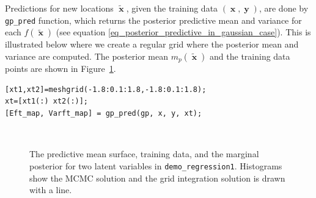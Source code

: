 \documentclass[twoside,11pt]{article}
\DeclareMathOperator{\x}{\mathbf{x}}
\DeclareMathOperator{\y}{\mathbf{y}}
\newcommand{\code}[1]{{\normalfont\texttt{#1}}}
\begin{document}
Predictions for new locations $\tilde{\x}$, given the training data
$(\x,\y)$, are done by \code{gp\_pred} function, which returns the
posterior predictive mean and variance for each $f(\tilde{\x})$ (see
equation \eqref{eq_posterior_predictive_in_gaussian_case}). This is
illustrated below where we create a regular grid where the posterior
mean and variance are computed. The posterior mean $m_{p}(\tilde{\x})$
and the training data points are shown in
Figure~\ref{demo_regression1_fig1}.

\begin{verbatim}
[xt1,xt2]=meshgrid(-1.8:0.1:1.8,-1.8:0.1:1.8);
xt=[xt1(:) xt2(:)];
[Eft_map, Varft_map] = gp_pred(gp, x, y, xt);
\end{verbatim}


\begin{figure}[]
    \begin{center}
      ~
       \caption[]{The predictive mean surface, training data, and the
         marginal posterior for two latent variables in
         \code{demo\_regression1}. Histograms show the MCMC solution
         and the grid integration solution is drawn with a
         line.}\label{demo_regression1_fig1}
    \end{center}
\end{figure}
\end{document}
